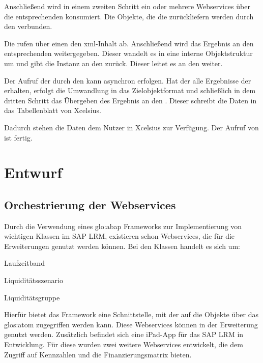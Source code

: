 \begin{onehalfspacing}
Anschließend wird in einem zweiten Schritt ein oder mehrere Webservices über die entsprechenden  konsumiert. Die Objekte, die die  zurückliefern werden durch den  verbunden.

Die  rufen über einen  den \gls{xml}-Inhalt ab. Anschließend wird das Ergebnis an den entsprechenden  weitergegeben. Dieser wandelt es in eine interne Objektstruktur um und gibt die Instanz an den  zurück. Dieser leitet es an den  weiter.

Der Aufruf der  durch den  kann asynchron erfolgen. Hat der  alle Ergebnisse der  erhalten, erfolgt die Umwandlung in das Zielobjektformat und schließlich in dem dritten Schritt das Übergeben des Ergebnis an den . Dieser schreibt die Daten in das Tabellenblatt von \gls{Xcelsius}.

Dadurch stehen die Daten dem Nutzer in \gls{Xcelsius} zur Verfügung. Der Aufruf von  ist fertig.

\section{Entwurf}

\subsection{Orchestrierung der Webservices}
Durch die Verwendung eines \gls{glo:abap} Frameworks zur Implementierung von wichtigen Klassen im SAP LRM, existieren schon Webservices, die für die Erweiterungen genutzt werden können. Bei den Klassen handelt es sich um:

\begin{seList}
\item Laufzeitband
\item Liquiditätsszenario
\item Liquiditätsgruppe
\end{seList}

Hierfür bietet das Framework eine Schnittstelle, mit der auf die Objekte über das \gls{glos:atom} zugegriffen werden kann. Diese Webservices können in der Erweiterung genutzt werden. Zusätzlich befindet sich eine iPad-App für das SAP LRM in Entwicklung. Für diese wurden zwei weitere Webservices entwickelt, die dem Zugriff auf Kennzahlen und die Finanzierungsmatrix bieten.


\end{onehalfspacing}
